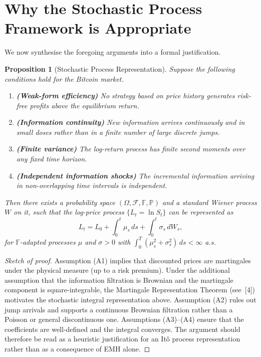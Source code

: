 \documentclass[12pt, a4paper, oneside]{report}
\theoremstyle{plain}
\newtheorem{proposition}[theorem]{Proposition}
\theoremstyle{definition}
\theoremstyle{remark}
\newcommand{\Prob}{\mathbb{P}}
\newcommand{\F}{\mathcal{F}}
\begin{document}
\section{Why the Stochastic Process Framework is Appropriate}

We now synthesise the foregoing arguments into a formal justification.

\begin{proposition}[Stochastic Process Representation]
\label{prop:sp_rep}
Suppose the following conditions hold for the Bitcoin market.
\begin{enumerate}[leftmargin=1.25cm, label=\textup{(A\arabic*)}]
  \item \textbf{(Weak-form efficiency)}  No strategy based on price history
    generates risk-free profits above the equilibrium return.
  \item \textbf{(Information continuity)}  New information arrives continuously
    and in small doses rather than in a finite number of large discrete jumps.
  \item \textbf{(Finite variance)}  The log-return process has finite second moments
    over any fixed time horizon.
  \item \textbf{(Independent information shocks)}  The incremental information
    arriving in non-overlapping time intervals is independent.
\end{enumerate}
Then there exists a probability space $(\Omega, \F, \mathbb{F}, \Prob)$ and a
standard Wiener process $W$ on it, such that the log-price process
$\{L_t = \ln S_t\}$ can be represented as
\[
  L_t = L_0 + \int_0^t \mu_s\,ds + \int_0^t \sigma_s\,dW_s,
\]
for $\mathbb{F}$-adapted processes $\mu$ and $\sigma > 0$ with
$\int_0^T (\mu_s^2 + \sigma_s^2)\,ds < \infty$ a.s.
\end{proposition}

\begin{proof}[Sketch of proof]
Assumption (A1) implies that discounted prices are martingales under the physical
measure (up to a risk premium).  Under the additional assumption that the
information filtration is Brownian and the martingale component is
square-integrable, the Martingale Representation Theorem (see~[4]) motivates
the stochastic integral representation above.  Assumption (A2) rules out jump
arrivals and supports a continuous Brownian filtration rather than a Poisson or
general discontinuous one.  Assumptions (A3)--(A4) ensure that the coefficients
are well-defined and the integral converges.  The argument should therefore be
read as a heuristic justification for an It\^{o} process representation rather
than as a consequence of EMH alone.
\end{proof}
\end{document}
